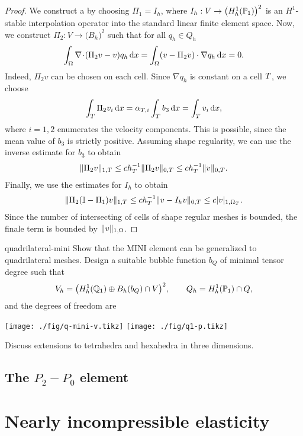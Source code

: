 \begin{proof}
  We construct a  by choosing
  $\Pi_1 = I_h$, where $I_h:V\to \bigl(H^1_h(\P_1)\bigr)^2$ is an
  $H^1$-stable interpolation operator into the standard linear finite
  element space. Now, we construct $\Pi_2: V \to \bigl(B_h\bigr)^2$
  such that for all $q_h\in Q_h$
  \begin{gather*}
    \int_\domain \div(\Pi_2 v-v) q_h \dx
    = \int_\domain (v-\Pi_2v)\cdot\nabla q_h\dx
    = 0.
  \end{gather*}
  Indeed, $\Pi_2 v$ can be chosen on each cell. Since $\nabla q_h$ is
  constant on a cell $\cell$, we choose
  \begin{gather*}
    \int_\cell \Pi_2 v_i \dx
    = \alpha_{\cell,i} \int_\cell b_3\dx
    = \int_\cell v_i\dx,
  \end{gather*}
  where $i=1,2$ enumerates the velocity components. This is possible,
  since the mean value of $b_3$ is strictly positive. Assuming shape
  regularity, we can use the inverse estimate for $b_3$ to obtain
  \begin{gather*}
    \norm{\Pi_2 v}_{1,\cell}
    \le c h_\cell^{-1} \norm{\Pi_2 v}_{0,\cell}
    \le c h_\cell^{-1} \norm{v}_{0,\cell}.
  \end{gather*}
  Finally, we use the estimates for $I_h$ to obtain
  \begin{gather*}
    \norm{\Pi_2 (\identity-\Pi_1) v}_{1,\cell}
    \le c h_\cell^{-1} \norm{v-I_h v}_{0,\cell}
    \le c \snorm{v}_{1,\domain_\cell}.
  \end{gather*}
  Since the number of intersecting of cells of shape regular meshes is
  bounded, the finale term is bounded by $\norm v_{1,\domain}$.
\end{proof}

\begin{Problem}{quadrilateral-mini}
  Show that the MINI element can be generalized to quadrilateral
  meshes. Design a suitable bubble function $b_Q$ of minimal tensor
  degree such that
  \begin{gather*}
    V_h = \bigl(H^1_h(\Q_1) \oplus B_h(b_Q) \cap V\bigr)^2,
    \qquad
    Q_h = H^1_h(\P_1) \cap Q,
  \end{gather*}
  and the degrees of freedom are
  \begin{center}
    \texttt{[image: ./fig/q-mini-v.tikz]}
    \hspace{1cm}
    \texttt{[image: ./fig/q1-p.tikz]}
  \end{center}

  Discuss extensions to tetrahedra and hexahedra in three dimensions.
\end{Problem}

\subsection{The $P_2-P_0$ element}

\section{Nearly incompressible elasticity}

